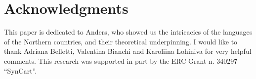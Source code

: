 \documentclass[output=paper]{LSP/langsci}
\begin{document}
\section*{Acknowledgments}

This paper is dedicated to Anders, who showed us the intricacies of the languages of the Northern countries, and their theoretical underpinning.
I would like to thank Adriana Belletti, Valentina Bianchi and Karoliina Lohiniva for very helpful comments. This research was supported in part by the ERC Grant n. 340297 “SynCart”. 


{\sloppy\printbibliography[heading=subbibliography,notkeyword=this]}
\end{document}
